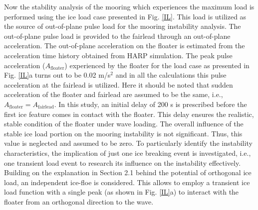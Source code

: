 \documentclass[review]{elsarticle}
\begin{document}
Now the stability analysis of the mooring which experiences the maximum load is performed using the ice load case presented in Fig. \ref{IL}. This load is utilized as the source of out-of-plane pulse load for the mooring instability analysis. The out-of-plane pulse load is provided to the fairlead through an out-of-plane acceleration. The out-of-plane acceleration on the floater is estimated from the acceleration time history obtained from HARP simulation. The peak pulse acceleration ($A_{\mathrm{floater}}$) experienced by the floater for the load case as presented in Fig. \ref{IL}a turns out to be 0.02 m/s$^2$ and in all the calculations this pulse acceleration at the fairlead is utilized. Here it should be noted that sudden acceleration of the floater and fairlead are assumed to be the same, i.e., $A_{\mathrm{floater}}= A_{\mathrm{fairlead}}$. In this study, an initial delay of 200 s is prescribed before the first ice feature comes in contact with the floater. This delay ensures the realistic, stable condition of the floater under wave loading. The overall influence of the stable ice load portion on the mooring instability is not significant. Thus, this value is neglected and assumed to be zero. To particularly identify the instability characteristics, the implication of just one ice breaking event is investigated, i.e., one transient load event to research its influence on the instability effectively. Building on the explanation in Section 2.1 behind the potential of orthogonal ice load, an independent ice-floe is considered.  This allows to employ a transient ice load function with a single peak (as shown in Fig. \ref{IL}a) to interact with the floater from an orthogonal direction to the wave.
\end{document}

